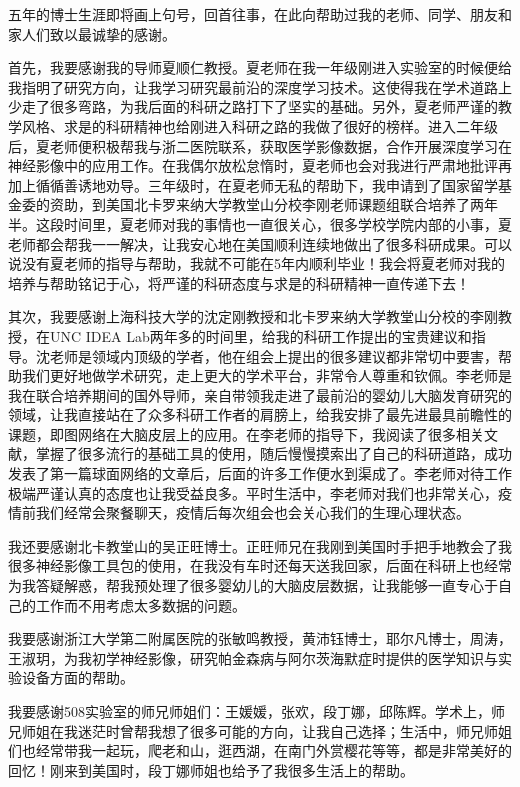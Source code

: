 \cleardoublepage
{}
五年的博士生涯即将画上句号，回首往事，在此向帮助过我的老师、同学、朋友和家人们致以最诚挚的感谢。

首先，我要感谢我的导师夏顺仁教授。夏老师在我一年级刚进入实验室的时候便给我指明了研究方向，让我学习研究最前沿的深度学习技术。这使得我在学术道路上少走了很多弯路，为我后面的科研之路打下了坚实的基础。另外，夏老师严谨的教学风格、求是的科研精神也给刚进入科研之路的我做了很好的榜样。进入二年级后，夏老师便积极帮我与浙二医院联系，获取医学影像数据，合作开展深度学习在神经影像中的应用工作。在我偶尔放松怠惰时，夏老师也会对我进行严肃地批评再加上循循善诱地劝导。三年级时，在夏老师无私的帮助下，我申请到了国家留学基金委的资助，到美国北卡罗来纳大学教堂山分校李刚老师课题组联合培养了两年半。这段时间里，夏老师对我的事情也一直很关心，很多学校学院内部的小事，夏老师都会帮我一一解决，让我安心地在美国顺利连续地做出了很多科研成果。可以说没有夏老师的指导与帮助，我就不可能在5年内顺利毕业！我会将夏老师对我的培养与帮助铭记于心，将严谨的科研态度与求是的科研精神一直传递下去！

其次，我要感谢上海科技大学的沈定刚教授和北卡罗来纳大学教堂山分校的李刚教授，在UNC IDEA Lab两年多的时间里，给我的科研工作提出的宝贵建议和指导。沈老师是领域内顶级的学者，他在组会上提出的很多建议都非常切中要害，帮助我们更好地做学术研究，走上更大的学术平台，非常令人尊重和钦佩。李老师是我在联合培养期间的国外导师，亲自带领我走进了最前沿的婴幼儿大脑发育研究的领域，让我直接站在了众多科研工作者的肩膀上，给我安排了最先进最具前瞻性的课题，即图网络在大脑皮层上的应用。在李老师的指导下，我阅读了很多相关文献，掌握了很多流行的基础工具的使用，随后慢慢摸索出了自己的科研道路，成功发表了第一篇球面网络的文章后，后面的许多工作便水到渠成了。李老师对待工作极端严谨认真的态度也让我受益良多。平时生活中，李老师对我们也非常关心，疫情前我们经常会聚餐聊天，疫情后每次组会也会关心我们的生理心理状态。

我还要感谢北卡教堂山的吴正旺博士。正旺师兄在我刚到美国时手把手地教会了我很多神经影像工具包的使用，在我没有车时还每天送我回家，后面在科研上也经常为我答疑解惑，帮我预处理了很多婴幼儿的大脑皮层数据，让我能够一直专心于自己的工作而不用考虑太多数据的问题。

我要感谢浙江大学第二附属医院的张敏鸣教授，黄沛钰博士，耶尔凡博士，周涛，王淑玥，为我初学神经影像，研究帕金森病与阿尔茨海默症时提供的医学知识与实验设备方面的帮助。

我要感谢508实验室的师兄师姐们：王媛媛，张欢，段丁娜，邱陈辉。学术上，师兄师姐在我迷茫时曾帮我想了很多可能的方向，让我自己选择；生活中，师兄师姐们也经常带我一起玩，爬老和山，逛西湖，在南门外赏樱花等等，都是非常美好的回忆！刚来到美国时，段丁娜师姐也给予了我很多生活上的帮助。

